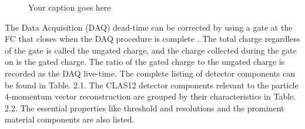     

\iffalse

    \begin{figure}[H]
        \centering
        \hfill
        \hfill
        \caption{Your caption goes here}
        \label{fig:others}
    \end{figure}

    
    The Data Acquisition (DAQ) \parencite{Boyarinov2020TheSystem} dead-time can be corrected by using a gate at the FC that closes when the DAQ procedure is complete \parencite{Baltzell2020ThePerformance}. The total charge regardless of the gate is called the ungated charge, and the charge collected during the gate on is the gated charge. The ratio of the gated charge to the ungated charge is recorded as the DAQ live-time. The complete listing of detector components can be found in Table. 2.1. The CLAS12 detector components relevant to the particle 4-momentum vector reconstruction are grouped by their characteristics in Table. 2.2. The essential properties like threshold and resolutions and the prominent material components are also listed.



